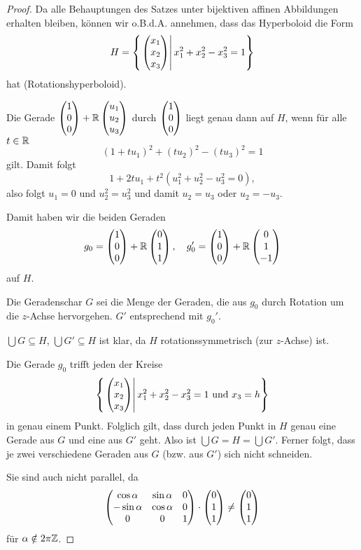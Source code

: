 \documentclass[
 a4paper,
 12pt,
 parskip=half
 ]{scrartcl}
\theoremstyle{plain}
\theoremstyle{definition}
\begin{document}
\begin{proof}
  Da alle Behauptungen des Satzes unter bijektiven affinen Abbildungen erhalten
  bleiben, können wir o.B.d.A. annehmen, dass das Hyperboloid die Form
  \[ H = \left\{ \left. \begin{pmatrix}x_1\\x_2\\x_3\end{pmatrix} \right| x_1^2 + x_2^2 - x_3^2 = 1
    \right\} \]
  hat (Rotationshyperboloid).

  Die Gerade $\begin{pmatrix}1\\0\\0\end{pmatrix} + \mathbb{R} \begin{pmatrix}u_1 \\ u_2 \\ u_3\end{pmatrix}$ durch
  $\begin{pmatrix}1\\0\\0\end{pmatrix}$ liegt genau dann auf $H$, wenn für alle $t \in \mathbb{R}$
  \[ (1+t u_1)^2 + (tu_2)^2 - (tu_3)^2 = 1 \]
  gilt. Damit folgt
  \[ 1 + 2 t u_1 + t^2(u_1^2 + u_2^2 - u_3^2 = 0), \]
  also folgt $u_1 = 0$ und $u_2^2 = u_3^2$ und damit $u_2=u_3$ oder $u_2=-u_3$.

  Damit haben wir die beiden Geraden
  \[ g_0 = \begin{pmatrix}1\\0\\0\end{pmatrix} + \mathbb{R} \begin{pmatrix}0\\1\\1\end{pmatrix}, \quad g_0' = \begin{pmatrix}1\\0\\0\end{pmatrix} +
    \mathbb{R} \begin{pmatrix}0\\1\\-1\end{pmatrix} \]
  auf $H$.

  Die Geradenschar $G$ sei die Menge der Geraden, die aus $g_0$ durch Rotation
  um die $z$-Achse hervorgehen. $G'$ entsprechend mit $g_0'$.

  $\bigcup G \subseteq H$, $\bigcup G' \subseteq H$ ist klar, da $H$
  rotationssymmetrisch (zur $z$-Achse) ist.

  Die Gerade $g_0$ trifft jeden der Kreise
  \[ \left\{  \left. \begin{pmatrix}x_1\\x_2\\x_3\end{pmatrix} \right| x_1^2 + x_2^2 - x_3^2 = 1
      \text{ und } x_3 = h \right\} \]
  in genau einem Punkt. Folglich gilt, dass durch jeden Punkt in $H$ genau eine
  Gerade aus $G$ und eine aus $G'$ geht. Also ist $\bigcup G = H = \bigcup G'$.
  Ferner folgt, dass je zwei verschiedene Geraden aus $G$ (bzw. aus $G'$) sich
  nicht schneiden.

  Sie sind auch nicht parallel, da
  \[ \begin{pmatrix}
      \cos \alpha & \sin \alpha & 0 \\
      - \sin \alpha & \cos \alpha & 0 \\
      0 & 0 & 1
    \end{pmatrix}
    \cdot \begin{pmatrix}0\\1\\1\end{pmatrix} \ne \begin{pmatrix}0\\1\\1\end{pmatrix} \]
  für $\alpha \notin 2 \pi \mathbb{Z}$.


\end{proof}
\end{document}
